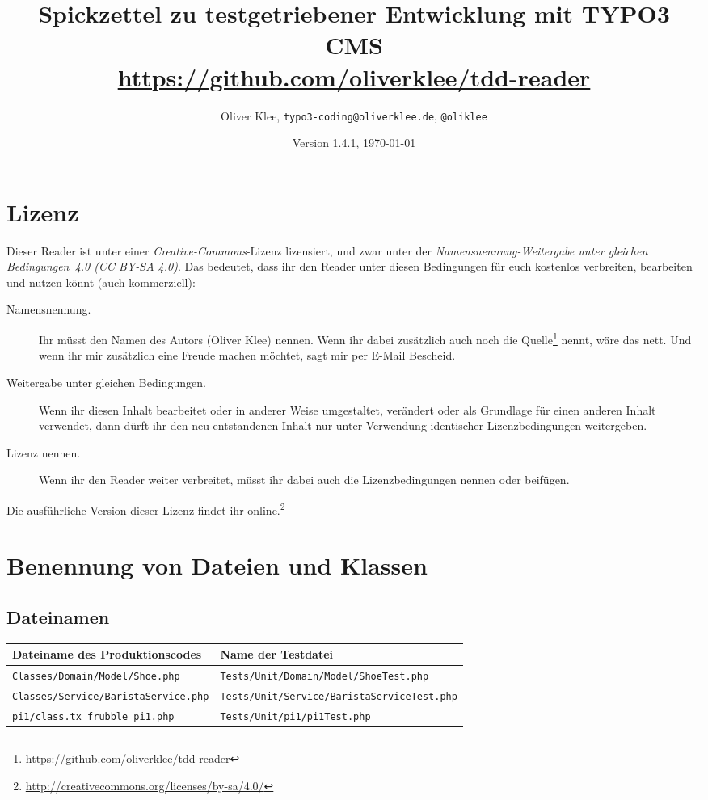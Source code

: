 \documentclass[a4paper,twoside,landscape]{scrartcl}
\author{Oliver Klee, \texttt{typo3-coding@oliverklee.de}, \texttt{@oliklee}}
\date{Version 1.4.1, \today}
\title{
  Spickzettel zu testgetriebener Entwicklung mit TYPO3 CMS \\
  \url{https://github.com/oliverklee/tdd-reader}
}
\newcommand{\fett}[1]{\textsf{\textbf{#1}}}
\begin{document}
\maketitle

\section*{Lizenz}

Dieser Reader ist unter einer \emph{Creative-Commons}-Lizenz lizensiert, und zwar unter der \emph{Namensnennung-Weitergabe unter gleichen Bedingungen~4.0 (CC BY-SA 4.0)}. Das bedeutet, dass ihr den Reader unter diesen Bedingungen für euch kostenlos verbreiten, bearbeiten und nutzen könnt (auch kommerziell):

\begin{description}
  \item[Namensnennung.] Ihr müsst den Namen des Autors (Oliver Klee) nennen. Wenn ihr dabei zusätzlich auch noch die Quelle\footnote{\url{https://github.com/oliverklee/tdd-reader}} nennt, wäre das nett. Und wenn ihr mir zusätzlich eine Freude machen möchtet, sagt mir per E-Mail Bescheid.
  \item[Weitergabe unter gleichen Bedingungen.] Wenn ihr diesen Inhalt bearbeitet oder in anderer Weise umgestaltet, verändert oder als Grundlage für einen anderen Inhalt verwendet, dann dürft ihr den neu entstandenen Inhalt nur unter Verwendung identischer Lizenzbedingungen weitergeben.
  \item[Lizenz nennen.] Wenn ihr den Reader weiter verbreitet, müsst ihr dabei auch die Lizenzbedingungen nennen oder beifügen.
\end{description} 

Die ausführliche Version dieser Lizenz findet ihr online.\footnote{\url{http://creativecommons.org/licenses/by-sa/4.0/}}


\newpage

\tableofcontents

\pagebreak

\section{Benennung von Dateien und Klassen}

\subsection{Dateinamen}

\begin{tabular}{|l|l|}
  \hline
  \fett{Dateiname des Produktionscodes} & \fett{Name der Testdatei} \\
  \hline
  \texttt{Classes/Domain/Model/Shoe.php} & \texttt{Tests/Unit/Domain/Model/ShoeTest.php} \\
  \hline
  \texttt{Classes/Service/BaristaService.php} & \texttt{Tests/Unit/Service/BaristaServiceTest.php} \\
  \hline
  \texttt{pi1/class.tx\_frubble\_pi1.php} & \texttt{Tests/Unit/pi1/pi1Test.php} \\
  \hline
\end{tabular}
\end{document}
